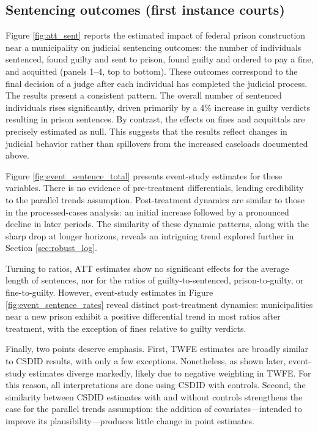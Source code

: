 \subsection*{Sentencing outcomes (first instance courts)}

Figure \ref{fig:att_sent} reports the estimated impact of federal prison construction near a municipality on judicial sentencing outcomes: the number of individuals sentenced, found guilty and sent to prison, found guilty and ordered to pay a fine, and acquitted (panels 1–4, top to bottom). These outcomes correspond to the final decision of a judge after each individual has completed the judicial process. The results present a consistent pattern. The overall number of sentenced individuals rises significantly, driven primarily by a 4\% increase in guilty verdicts resulting in prison sentences. By contrast, the effects on fines and acquittals are precisely estimated as null. This suggests that the results reflect changes in judicial behavior rather than spillovers from the increased caseloads documented above.

Figure \ref{fig:event_sentence_total} presents event-study estimates for these variables. There is no evidence of pre-treatment differentials, lending credibility to the parallel trends assumption. Post-treatment dynamics are similar to those in the processed-cases analysis: an initial increase followed by a pronounced decline in later periods. The similarity of these dynamic patterns, along with the sharp drop at longer horizons, reveals an intriguing trend explored further in Section \ref{sec:robust_log}.

Turning to ratios, ATT estimates show no significant effects for the average length of sentences, nor for the ratios of guilty-to-sentenced, prison-to-guilty, or fine-to-guilty. However, event-study estimates in Figure \ref{fig:event_sentence_rates} reveal distinct post-treatment dynamics: municipalities near a new prison exhibit a positive differential trend in most ratios after treatment, with the exception of fines relative to guilty verdicts. 

Finally, two points deserve emphasis. First, TWFE estimates are broadly similar to CSDID results, with only a few exceptions. Nonetheless, as shown later, event-study estimates diverge markedly, likely due to negative weighting in TWFE. For this reason, all interpretations are done using CSDID with controls. Second, the similarity between CSDID estimates with and without controls strengthens the case for the parallel trends assumption: the addition of covariates—intended to improve its plausibility—produces little change in point estimates.

